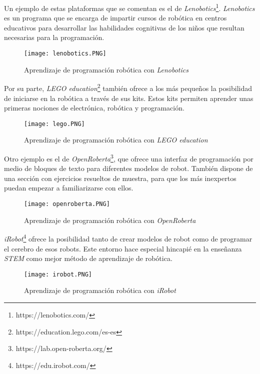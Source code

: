 Un ejemplo de estas plataformas que se comentan es el de \textit{Lenobotics}\footnote{https://lenobotics.com/}.  \textit{Lenobotics} es un programa que se encarga de impartir cursos de robótica en centros educativos para desarrollar las habilidades cognitivas de los niños que resultan necesarias para la programación. \newline

\clearpage
\begin{figure}[h!]
    \centering
    \texttt{[image: lenobotics.PNG]}
    \caption{Aprendizaje de programación robótica con \textit{Lenobotics}}
    \label{fig:lenobotics}
\end{figure}


Por su parte, \textit{LEGO education}\footnote{https://education.lego.com/es-es} también ofrece a los más pequeños la posibilidad de iniciarse en la robótica a través de sus kits. Estos kits permiten aprender unas primeras nociones de electrónica, robótica y programación. \newline

\begin{figure}[h!]
    \centering
    \texttt{[image: lego.PNG]}
    \caption{Aprendizaje de programación robótica con \textit{LEGO education}}
    \label{fig:lego}
\end{figure}

\clearpage
Otro ejemplo es el de \textit{OpenRoberta}\footnote{https://lab.open-roberta.org/}, que ofrece una interfaz de programación por medio de bloques de texto para diferentes modelos de robot. También dispone de una sección con ejercicios resueltos de muestra, para que los más inexpertos puedan empezar a familiarizarse con ellos.

\begin{figure}[h!]
    \centering
    \texttt{[image: openroberta.PNG]}
    \caption{Aprendizaje de programación robótica con \textit{OpenRoberta}}
    \label{fig:lego}
\end{figure}

\textit{iRobot}\footnote{https://edu.irobot.com/} ofrece la posibilidad tanto de crear modelos de robot como de programar el cerebro de esos robots. Este entorno hace especial hincapié en la enseñanza \textit{STEM} como mejor método de aprendizaje de robótica.

\begin{figure}[h!]
    \centering
    \texttt{[image: irobot.PNG]}
    \caption{Aprendizaje de programación robótica con \textit{iRobot}}
    \label{fig:lego}
\end{figure}

